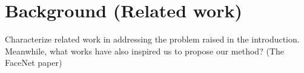 \section{Background (Related work)}


{
\setlength{\parindent}{4em}
\color{gray} 

\indent Characterize related work in addressing the problem raised in the
introduction. Meanwhile, what works have also inspired us to propose our method?  (The
FaceNet paper)

}
